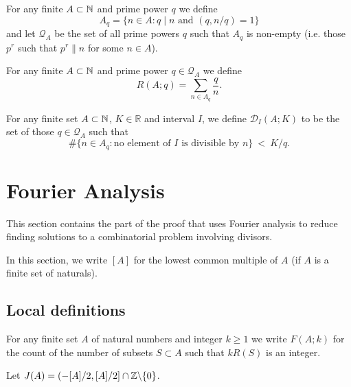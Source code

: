 \begin{definition}
  \label{def:local_part}
  \leanok
  For any finite $A\subset \mathbb{N}$ and prime power $q$ we define
  \[A_q = \{ n\in A : q\mid n\textrm{ and }(q,n/q)=1\}\]
  and let $\mathcal{Q}_A$ be the set of all prime powers $q$ such that $A_q$ is non-empty (i.e. those $p^r$ such that $p^r\| n$ for some $n\in A$).
\end{definition}

\begin{definition}
  \label{def:rec_sum_local}
  \leanok
  For any finite $A\subset \mathbb{N}$ and prime power $q\in\mathcal{Q}_A$ we define
  \[R(A;q) = \sum_{n\in A_q}\frac{q}{n}.\]
\end{definition}

\begin{definition}
  \label{def:interval_rare_ppowers}
  \leanok
  For any finite set $A\subset \mathbb{N}$, $K\in \mathbb{R}$ and interval $I$, we define $\mathcal{D}_I(A;K)$ to be the set of those $q\in\mathcal{Q}_A$ such that
  \[\#\{ n\in A_q: \textrm{no element of }I\textrm{ is divisible by }n\}\ <\ K / q.\]
\end{definition}


\chapter{Fourier Analysis}
\label{chap:fourier}

This section contains the part of the proof that uses Fourier analysis to reduce finding solutions to a combinatorial problem involving divisors.

In this section, we write $[A]$ for the lowest common multiple of $A$ (if $A$ is a finite set of naturals).
\section{Local definitions}

\begin{definition}
  \label{def:integer_count}
  \leanok
For any finite set $A$ of natural numbers and integer $k\geq 1$ we write $F(A;k)$ for the count of the number of subsets $S\subset A$ such that $kR(S)$ is an integer.
\end{definition}

\begin{definition}
  \label{def:j}
  \leanok
  Let $J(A) = (-[A]/2,[A]/2]\cap\mathbb{Z} \backslash \{0\}$.
\end{definition}

